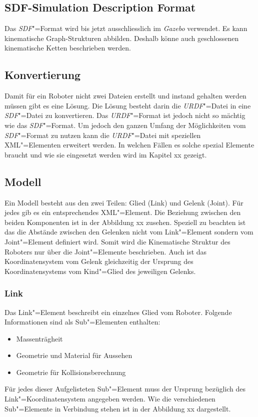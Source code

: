 \subsection{SDF-Simulation Description Format}
Das \textit{SDF}"=Format wird bis jetzt ausschliesslich im \textit{Gazebo} verwendet.
Es kann kinematische Graph-Strukturen abbilden.
Deshalb könne auch geschlossenen kinematische Ketten beschrieben werden.

\subsection{Konvertierung}
Damit für ein Roboter nicht zwei Dateien erstellt und instand gehalten werden müssen gibt es eine Lösung.
Die Lösung besteht darin die \textit{URDF}"=Datei in eine \textit{SDF}"=Datei zu konvertieren.
Das \textit{URDF}"=Format ist jedoch nicht so mächtig wie das \textit{SDF}"=Format.
Um jedoch den ganzen Umfang der Möglichkeiten vom \textit{SDF}"=Format zu nutzen kann die \textit{URDF}"=Datei mit speziellen XML"=Elementen erweitert werden.
In welchen Fällen es solche spezial Elemente braucht und wie sie eingesetzt werden wird im Kapitel xx gezeigt. %

\subsection{Modell}
Ein Modell besteht aus den zwei Teilen: Glied (Link) und Gelenk (Joint).
Für jedes gib es ein entsprechendes XML"=Element.
Die Beziehung zwischen den beiden Komponenten ist in der Abbildung xx zusehen. %
Speziell zu beachten ist das die Abstände zwischen den Gelenken nicht vom Link"=Element sondern vom Joint"=Element definiert wird.
Somit wird die Kinematische Struktur des Roboters nur über die Joint"=Elemente beschrieben.
Auch ist das Koordinatensystem vom Gelenk gleichzeitig der Ursprung des Koordinatensystems vom Kind"=Glied des jeweiligen Gelenks. 



\subsubsection*{Link}
Das Link"=Element beschreibt ein einzelnes Glied vom Roboter.
Folgende Informationen sind als Sub"=Elementen enthalten: 
\begin{itemize}
\item Massenträgheit
\item Geometrie und Material für Aussehen
\item Geometrie für Kollisionsberechnung
\end{itemize}
Für jedes dieser Aufgelisteten Sub"=Element muss der Ursprung bezüglich des Link"=Koordinatensystem angegeben werden.
Wie die verschiedenen Sub"=Elemente in Verbindung stehen ist in der Abbildung xx dargestellt. %

